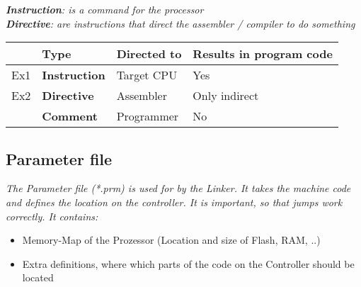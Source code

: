 \textit{
    \textbf{Instruction}: is a command for the processor
} \\
\textit{
    \textbf{Directive}: are instructions that direct the assembler /
    compiler to do something
}

\begin{tabular}{rlll}
        & \textbf{Type} & \textbf{Directed to}  & \textbf{Results in program code} \\
    \hline
    Ex1 & \textbf{Instruction} & Target CPU     & Yes \\
    Ex2 & \textbf{Directive}   & Assembler      & Only indirect \\
        & \textbf{Comment}     & Programmer     & No \\
\end{tabular}

\subsection{Parameter file}

\textit{
    The Parameter file (*.prm) is used for by the Linker. It takes the machine
    code and defines the location on the controller. It is important,
    so that jumps work correctly.
    It contains:
}

\begin{itemize}
    \item{Memory-Map of the Prozessor (Location and size of Flash, RAM, ..)}
    \item{Extra definitions, where which parts of the code on the Controller should be located}
\end{itemize}

